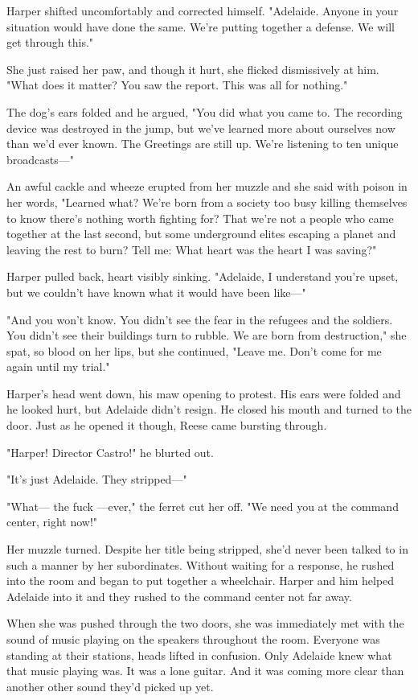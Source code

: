 Harper shifted uncomfortably and corrected himself. "Adelaide. Anyone in your situation would have done the same. We're putting together a defense. We will get through this."

She just raised her paw, and though it hurt, she flicked dismissively at him. "What does it matter? You saw the report. This was all for nothing."

The dog's ears folded and he argued, "You did what you came to. The recording device was destroyed in the jump, but we've learned more about ourselves now than we'd ever known. The Greetings are still up. We're listening to ten unique broadcasts---"

An awful cackle and wheeze erupted from her muzzle and she said with poison in her words, "Learned what? We're born from a society too busy killing themselves to know there's nothing worth fighting for? That we're not a people who came together at the last second, but some underground elites escaping a planet and leaving the rest to burn? Tell me: What heart was the heart I was saving?"

Harper pulled back, heart visibly sinking. "Adelaide, I understand you're upset, but we couldn't have known what it would have been like---"

"And you won't know. You didn't see the fear in the refugees and the soldiers. You didn't see their buildings turn to rubble. We are born from destruction," she spat, so blood on her lips, but she continued, "Leave me. Don't come for me again until my trial."

Harper's head went down, his maw opening to protest. His ears were folded and he looked hurt, but Adelaide didn't resign. He closed his mouth and turned to the door. Just as he opened it though, Reese came bursting through.

"Harper! Director Castro!" he blurted out.

"It's just Adelaide. They stripped---"

"What--- the fuck ---ever," the ferret cut her off. "We need you at the command center, right now!"

Her muzzle turned. Despite her title being stripped, she'd never been talked to in such a manner by her subordinates. Without waiting for a response, he rushed into the room and began to put together a wheelchair. Harper and him helped Adelaide into it and they rushed to the command center not far away.

When she was pushed through the two doors, she was immediately met with the sound of music playing on the speakers throughout the room. Everyone was standing at their stations, heads lifted in confusion. Only Adelaide knew what that music playing was. It was a lone guitar. And it was coming more clear than another other sound they'd picked up yet.

